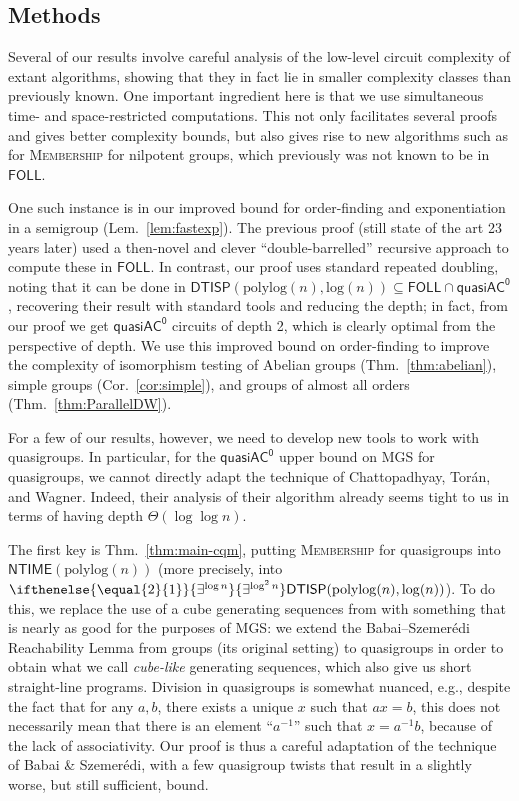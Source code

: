 \documentclass{article}
\newcommand{\algprobm}[1]{\textsc{#1}\xspace}
\newcommand{\betacc}[1]{\ifthenelse{\equal{#1}{1}}{\exists^{\log n}}{\exists^{\log^{#1}n}}} %
\newcommand*{\ComplexityClass}[1]{\ensuremath{\mathsf{#1}}\xspace}
\newcommand{\DTISP}{\ComplexityClass{DTISP}}
\newcommand{\DTISPpll}{\ensuremath{\DTISP(\mathrm{polylog}(n),\mathrm{log}(n))}\xspace}
\newcommand{\qACz}{\ComplexityClass{quasiAC^0}}
\newcommand{\FOLL}{\ComplexityClass{FOLL}}
\newcommand{\NTIME}{\ComplexityClass{NTIME}}
\begin{document}
\subsection{Methods}
Several of our results involve careful analysis of the low-level circuit complexity of extant algorithms, showing that they in fact lie in smaller complexity classes than previously known. One important ingredient here is that we use simultaneous time- and space-restricted computations. This not only facilitates several proofs and gives better complexity bounds, but also gives rise to new algorithms such as for \algprobm{Membership} for nilpotent groups, which previously was not known to be in \FOLL.

One such instance is in our improved bound for order-finding and exponentiation in a semigroup (Lem.~\ref{lem:fastexp}). The previous proof \cite{BKLM} (still state of the art 23 years later) used a then-novel and clever ``double-barrelled'' recursive approach to compute these in \FOLL. In contrast, our proof uses standard repeated doubling, noting that it can be done in $\DTISPpll \subseteq \FOLL \cap \qACz$, recovering their result with standard tools and reducing the depth; in fact, from our proof we get $\qACz$ circuits of depth 2, which is clearly optimal from the perspective of depth.
 We use this improved bound on order-finding to improve the complexity of isomorphism testing of Abelian groups (Thm.~\ref{thm:abelian}), simple groups (Cor.~\ref{cor:simple}), and groups of almost all orders (Thm.~\ref{thm:ParallelDW}). 


For a few of our results, however, we need to develop new tools to work with quasigroups. 
In particular,  for the $\qACz$ upper bound on \algprobm{MGS} for quasigroups, we cannot directly adapt the technique of Chattopadhyay, Torán, and Wagner. 
Indeed, their analysis of their algorithm already seems tight to us in terms of having depth $\Theta(\log \log n)$.

The first key is Thm.~\ref{thm:main-cqm}, putting \algprobm{Membership} for quasigroups into $\NTIME(\mathrm{polylog}(n))$ (more precisely, into $\betacc{2}\DTISPpll$). To do this, we replace the use of a cube generating sequences from \cite{ChattopadhyayToranWagner} with something that is nearly as good for the purposes of \algprobm{MGS}: we extend the Babai--Szemer\'edi  Reachability Lemma \cite[Thm.~3.1]{BabaiSzemeredi} from groups (its original setting) to quasigroups in order to obtain what we call \emph{cube-like} generating sequences, which also give us short straight-line programs. Division in quasigroups is somewhat nuanced, e.g., despite the fact that for any $a,b$, there exists a unique $x$ such that $ax = b$, this does not necessarily mean that there is an element ``$a^{-1}$'' such that $x=a^{-1}b$, because of the lack of associativity. Our proof is thus a careful adaptation of the technique of Babai \& Szemer\'edi, with a few quasigroup twists that result in a slightly worse, but still sufficient, bound.
\end{document}
